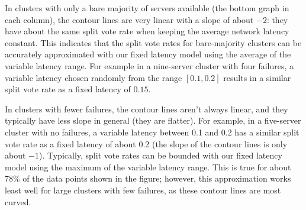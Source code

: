 In clusters with only a bare majority of servers available (the bottom
graph in each column), the contour lines are very linear with a slope of
about $-2$: they have about the same split vote rate when keeping the
average network latency constant. This indicates that the split vote
rates for bare-majority clusters
can be accurately approximated with our fixed latency model using
the average of the variable latency range. For example in a nine-server
cluster with four failures, a variable latency chosen randomly from the
range $[0.1, 0.2]$ results in a similar split vote rate as a fixed
latency of $0.15$.

In clusters with fewer failures, the contour lines aren't always linear,
and they typically have less slope in general (they are flatter). For
example, in a five-server cluster with no failures, a variable latency
between 0.1 and 0.2 has a similar split vote rate as a fixed latency of
about 0.2 (the slope of the contour lines is only about $-1$).
Typically, split vote rates can be bounded with our fixed latency model
using the maximum of the variable latency range. This is true for about
78\% of the data points shown in the figure; however, this approximation
works least well for large clusters with few failures, as these contour
lines are most curved.
